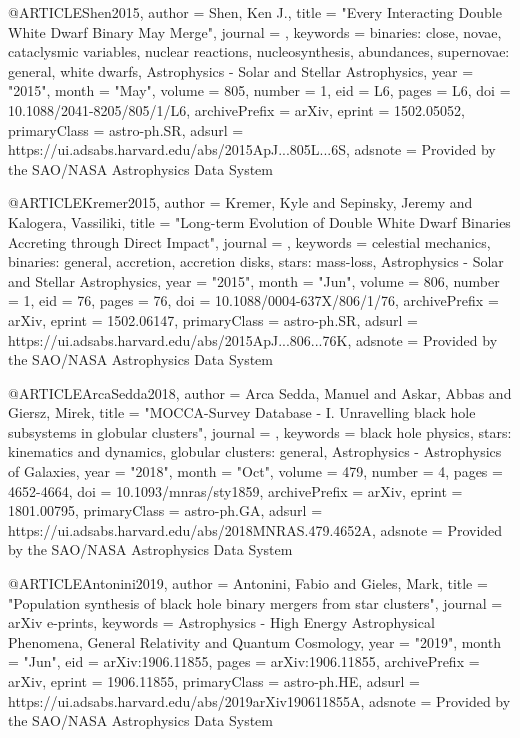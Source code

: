 \documentclass[twocolumn,tighten]{aastex63}
\begin{document}
@ARTICLE{Shen2015,
       author = {{Shen}, Ken J.},
        title = "{Every Interacting Double White Dwarf Binary May Merge}",
      journal = {\apjl},
     keywords = {binaries: close, novae, cataclysmic variables, nuclear reactions, nucleosynthesis, abundances, supernovae: general, white dwarfs, Astrophysics - Solar and Stellar Astrophysics},
         year = "2015",
        month = "May",
       volume = {805},
       number = {1},
          eid = {L6},
        pages = {L6},
          doi = {10.1088/2041-8205/805/1/L6},
archivePrefix = {arXiv},
       eprint = {1502.05052},
 primaryClass = {astro-ph.SR},
       adsurl = {https://ui.adsabs.harvard.edu/abs/2015ApJ...805L...6S},
      adsnote = {Provided by the SAO/NASA Astrophysics Data System}
}

@ARTICLE{Kremer2015,
       author = {{Kremer}, Kyle and {Sepinsky}, Jeremy and {Kalogera}, Vassiliki},
        title = "{Long-term Evolution of Double White Dwarf Binaries Accreting through Direct Impact}",
      journal = {\apj},
     keywords = {celestial mechanics, binaries: general, accretion, accretion disks, stars: mass-loss, Astrophysics - Solar and Stellar Astrophysics},
         year = "2015",
        month = "Jun",
       volume = {806},
       number = {1},
          eid = {76},
        pages = {76},
          doi = {10.1088/0004-637X/806/1/76},
archivePrefix = {arXiv},
       eprint = {1502.06147},
 primaryClass = {astro-ph.SR},
       adsurl = {https://ui.adsabs.harvard.edu/abs/2015ApJ...806...76K},
      adsnote = {Provided by the SAO/NASA Astrophysics Data System}
}

@ARTICLE{ArcaSedda2018,
       author = {{Arca Sedda}, Manuel and {Askar}, Abbas and {Giersz}, Mirek},
        title = "{MOCCA-Survey Database - I. Unravelling black hole subsystems in globular clusters}",
      journal = {\mnras},
     keywords = {black hole physics, stars: kinematics and dynamics, globular clusters: general, Astrophysics - Astrophysics of Galaxies},
         year = "2018",
        month = "Oct",
       volume = {479},
       number = {4},
        pages = {4652-4664},
          doi = {10.1093/mnras/sty1859},
archivePrefix = {arXiv},
       eprint = {1801.00795},
 primaryClass = {astro-ph.GA},
       adsurl = {https://ui.adsabs.harvard.edu/abs/2018MNRAS.479.4652A},
      adsnote = {Provided by the SAO/NASA Astrophysics Data System}
}

@ARTICLE{Antonini2019,
       author = {{Antonini}, Fabio and {Gieles}, Mark},
        title = "{Population synthesis of black hole binary mergers from star clusters}",
      journal = {arXiv e-prints},
     keywords = {Astrophysics - High Energy Astrophysical Phenomena, General Relativity and Quantum Cosmology},
         year = "2019",
        month = "Jun",
          eid = {arXiv:1906.11855},
        pages = {arXiv:1906.11855},
archivePrefix = {arXiv},
       eprint = {1906.11855},
 primaryClass = {astro-ph.HE},
       adsurl = {https://ui.adsabs.harvard.edu/abs/2019arXiv190611855A},
      adsnote = {Provided by the SAO/NASA Astrophysics Data System}
}
\end{document}
